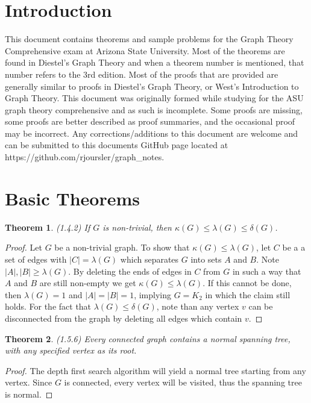 \documentclass[12pt]{article}
\newtheorem{theorem}{Theorem}
\begin{document}
\section{Introduction} This document contains theorems and sample
problems for the Graph Theory Comprehensive exam at Arizona State
University. Most of the theorems are found in Diestel's Graph Theory
and when a theorem number is mentioned, that number refers to the 3rd
edition. Most of the proofs that are provided are generally similar to
proofs in Diestel's Graph Theory, or West's Introduction to Graph
Theory. This document was originally formed while studying for the ASU
graph theory comprehensive and as such is incomplete. Some proofs are
missing, some proofs are better described as proof summaries, and the
occasional proof may be incorrect. Any corrections/additions to this
document are welcome and can be submitted to this documents GitHub
page located at https://github.com/rjoursler/graph\_notes.

\section{Basic Theorems}
\begin{theorem} (1.4.2) If $G$ is non-trivial, then
  $\kappa(G) \leq \lambda(G) \leq \delta(G)$.
\end{theorem}
\begin{proof} Let $G$ be a non-trivial graph. To show that
  $\kappa(G) \leq \lambda(G)$, let $C$ be a a set of edges with
  $|C| = \lambda(G)$ which separates $G$ into sets $A$ and $B$. Note
  $|A|, |B| \geq \lambda(G)$. By deleting the ends of edges in $C$
  from $G$ in such a way that $A$ and $B$ are still non-empty we get
  $\kappa(G) \leq \lambda(G)$. If this cannot be done, then
  $\lambda(G) = 1$ and $|A| = |B| = 1$, implying $G = K_2$ in which
  the claim still holds. For the fact that
  $\lambda(G) \leq \delta(G)$, note than any vertex $v$ can be
  disconnected from the graph by deleting all edges which contain $v$.
\end{proof}

\begin{theorem} (1.5.6) Every connected graph contains a normal spanning tree, with any
  specified vertex as its root.
\end{theorem}
\begin{proof} The depth first search algorithm will yield a normal
  tree starting from any vertex. Since $G$ is connected, every vertex
  will be visited, thus the spanning tree is normal.
\end{proof}
\end{document}
